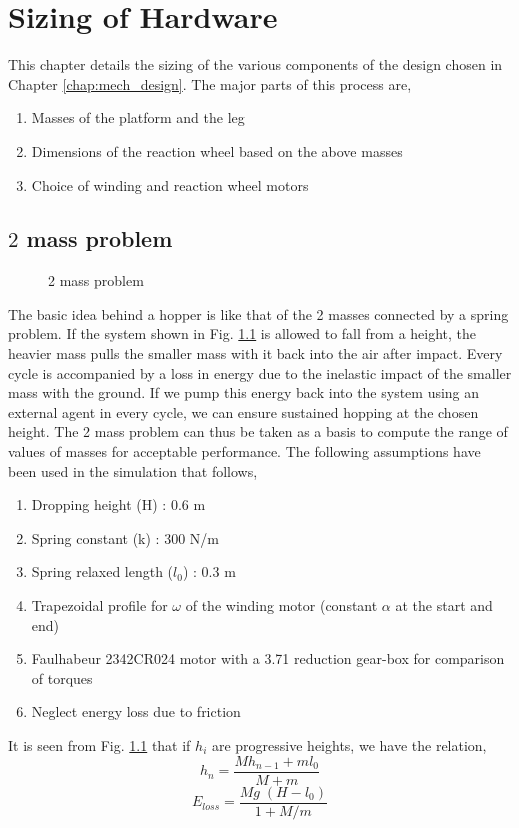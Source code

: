 \chapter{Sizing of Hardware}
\label{chap:sizing}
This chapter details the sizing of the various components of the design chosen in Chapter \ref{chap:mech_design}.
The major parts of this process are,
\begin{enumerate}
\item
Masses of the platform and the leg
\item
Dimensions of the reaction wheel based on the above masses
\item
Choice of winding and reaction wheel motors
\end{enumerate}

\section{$2$ mass problem}
\begin{figure}[!h]
\centering
\caption{2 mass problem}
\label{fig:4_2mass}
\end{figure}
The basic idea behind a hopper is like that of the 2 masses connected by a spring problem. If the system shown in Fig.
\ref{fig:4_2mass} is allowed to fall from a height, the heavier mass pulls the smaller mass with it back into the air
after impact. Every cycle is accompanied by a loss in energy due to the inelastic impact of the smaller mass with the
ground. If we pump this energy back into the system using an external agent in every cycle, we can ensure sustained
hopping at the chosen height. The 2 mass problem can thus be taken as a basis to compute the range of values of masses
for acceptable performance. The following assumptions have been used in the simulation that follows,
\begin{enumerate}
\item
Dropping height (H) : 0.6 m
\item
Spring constant (k) : 300 N/m
\item
Spring relaxed length ($l_0$) : 0.3 m
\item
Trapezoidal profile for $\omega$ of the winding motor (constant $\alpha$ at the start and end)
\item
Faulhabeur 2342CR024 motor with a 3.71 reduction gear-box for comparison of torques
\item
Neglect energy loss due to friction
\end{enumerate}
It is seen from Fig. \ref{fig:4_2mass} that if $h_i$ are progressive heights, we have the relation,
\begin{equation}
h_n = \frac{Mh_{n-1} + ml_0}{M + m}
\end{equation}
\begin{equation}
\label{eqn:4_eloss}
E_{loss} = \frac{Mg\;(H-l_0)}{1 + M/m}
\end{equation}

